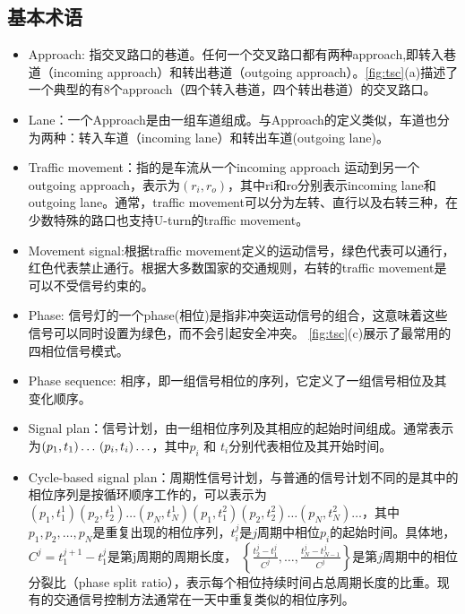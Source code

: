 \subsection{基本术语}
\begin{itemize}
    \item Approach: 指交叉路口的巷道。任何一个交叉路口都有两种approach,即转入巷道（incoming approach）和转出巷道（outgoing approach）。\autoref{fig:tsc}(a)描述了一个典型的有8个approach（四个转入巷道，四个转出巷道）的交叉路口。
    \item Lane：一个Approach是由一组车道组成。与Approach的定义类似，车道也分为两种：转入车道（incoming lane）和转出车道(outgoing lane)。
    \item Traffic movement：指的是车流从一个incoming approach 运动到另一个outgoing approach，表示为$\left(r_{i}, r_{o}\right)$，其中ri和ro分别表示incoming lane和outgoing lane。通常，traffic movement可以分为左转、直行以及右转三种，在少数特殊的路口也支持U-turn的traffic movement。
    \item Movement signal:根据traffic movement定义的运动信号，绿色代表可以通行，红色代表禁止通行。根据大多数国家的交通规则，右转的traffic movement是可以不受信号约束的。
    \item Phase: 信号灯的一个phase(相位)是指非冲突运动信号的组合，这意味着这些信号可以同时设置为绿色，而不会引起安全冲突。 \autoref{fig:tsc}(c)展示了最常用的四相位信号模式。
    \item Phase sequence: 相序，即一组信号相位的序列，它定义了一组信号相位及其变化顺序。
    \item Signal plan：信号计划，由一组相位序列及其相应的起始时间组成。通常表示为$\left(p_{1}, t_{1}\right) \ldots \\ \left(p_{i}, t_{i}\right) \ldots$，其中$p_{i}$ 和 $t_{i}$分别代表相位及其开始时间。
    \item Cycle-based signal plan：周期性信号计划，与普通的信号计划不同的是其中的相位序列是按循环顺序工作的，可以表示为
    $\left(p_{1}, t_{1}^{1}\right)\left(p_{2}, t_{2}^{1}\right) \ldots  \left(p_{N}, t_{N}^{1}\right)\left(p_{1}, t_{1}^{2}\right)\left(p_{2}, t_{2}^{2}\right) \ldots \left(p_{N}, t_{N}^{2}\right) \ldots$，其中$p_{1}, p_{2}, \ldots, p_{N}$是重复出现的相位序列，$t_i^j$是$j$周期中相位$p_i$的起始时间。具体地，$C^{j}=t_{1}^{j+1}-t_{1}^{j}$是第j周期的周期长度， $\left\{\frac{t_{2}^j-t_{1}^j}{C^j}, \ldots, \frac{t_{N}^j-t_{N-1}^j}{C^j}\right\}$是第$j$周期中的相位分裂比（phase split ratio），表示每个相位持续时间占总周期长度的比重。现有的交通信号控制方法通常在一天中重复类似的相位序列。
\end{itemize}


